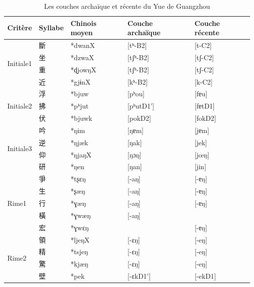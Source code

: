 \documentclass{scrbook}
\newcounter{c}[subsubsection]
\newcommand{\difwenbai}{couches archaïque et récente\xspace}
\newcommand{\diflaoxin}{sociolectes âgé et jeune\xspace}
\newcommand{\iso}{syllabes isolées\xspace}
\begin{document}
\begin{sloppypar}
\begin{table}[htbp]
  \centering
    \begin{tabular}{lllll}
    \toprule
    Critère & Syllabe & Chinois moyen  & Couche archaïque & Couche récente \\
    \midrule
    \multirow{4}[2]{*}{Initiale1} & 斷     & *dwanX & [tʰ-B2] & [t-C2] \\
          & 坐     & *dzwaX & [tʃʰ-B2] & [tʃ-C2] \\
          & 重     & *ɖjowŋX & [tʃʰ-B2] & [tʃ-C2] \\
          & 近     & *gjɨnX & [kʰ-B2] & [k-C2] \\
    \midrule
    \multirow{3}[2]{*}{Initiale2} & 浮     & *bjuw & [pʰou] & [fɐu] \\
          & 拂     & *pʰjut & [pʰutD1'] & [fɐtD1] \\
          & 伏     & *bjuwk & [pokD2] & [fokD2] \\
    \midrule
    \multirow{4}[2]{*}{Initiale3} & 吟     & *ŋim  & [ŋɐm] & [jɐm] \\
          & 逆     & *ŋjæk & [ŋak] & [jek] \\
          & 仰     & *ŋjaŋX & [ŋɔŋ] & [jœŋ] \\
          & 研     & *ŋen  & [ŋan] & [jin] \\
    \midrule
    \multirow{5}[2]{*}{Rime1} & 爭     & *tʂɛŋ & [-aŋ] & [-ɐŋ] \\
          & 生     & *ʂæŋ  & [-aŋ] & [-ɐŋ] \\
          & 行     & *ɣæŋ  & [-aŋ] & [-ɐŋ] \\
          & 橫     & *ɣwæŋ & [-aŋ] &  \\
          & 宏     & *ɣwɛŋ &       & [-ɐŋ] \\
    \midrule
    \multirow{4}[2]{*}{Rime2} & 領     & *ljeŋX & [-ɛŋ] & [-eŋ] \\
          & 精     & *tsjeŋ & [-ɛŋ] & [-eŋ] \\
          & 驚     & *kjæŋ & [-ɛŋ] & [-eŋ] \\
          & 壁     & *pek  & [-ɛkD1'] & [-ekD1] \\
    \bottomrule
    \end{tabular}%
  \caption{Les \difwenbai du Yue de Guangzhou}
  \label{tab:Guangzhou1}%
\end{table}%




\end{sloppypar}
\end{document}
